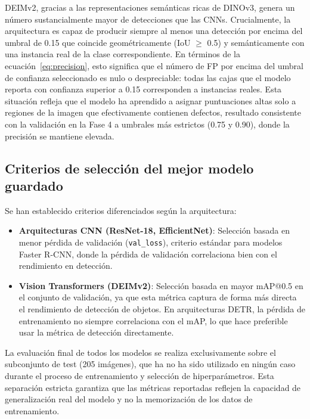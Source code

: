 DEIMv2, gracias a las representaciones semánticas ricas de DINOv3, genera un número sustancialmente mayor de detecciones que las CNNs. Crucialmente, la arquitectura es capaz de producir siempre al menos una detección por encima del umbral de 0.15 que coincide geométricamente (IoU $\geq$ 0.5) y semánticamente con una instancia real de la clase correspondiente. En términos de la ecuación~\eqref{eq:precision}, esto significa que el número de \acrshort{FP} por encima del umbral de confianza seleccionado es nulo o despreciable: todas las cajas que el modelo reporta con confianza superior a 0.15 corresponden a instancias reales. Esta situación refleja que el modelo ha aprendido a asignar puntuaciones altas solo a regiones de la imagen que efectivamente contienen defectos, resultado consistente con la validación en la Fase 4 a umbrales más estrictos (0.75 y 0.90), donde la precisión se mantiene elevada.

\subsection{Criterios de selección del mejor modelo guardado}

Se han establecido criterios diferenciados según la arquitectura:

\begin{itemize}
    \item \textbf{Arquitecturas CNN (ResNet-18, EfficientNet)}: Selección basada en menor pérdida de validación (\texttt{val\_loss}), criterio estándar para modelos Faster R-CNN, donde la pérdida de validación correlaciona bien con el rendimiento en detección.
    \item \textbf{Vision Transformers (DEIMv2)}: Selección basada en mayor mAP@0.5 en el conjunto de validación, ya que esta métrica captura de forma más directa el rendimiento de detección de objetos. En arquitecturas DETR, la pérdida de entrenamiento no siempre correlaciona con el mAP, lo que hace preferible usar la métrica de detección directamente.
\end{itemize}

La evaluación final de todos los modelos se realiza exclusivamente sobre el subconjunto de test (205 imágenes), que ha no ha sido utilizado en ningún caso durante el proceso de entrenamiento y selección de hiperparámetros. Esta separación estricta garantiza que las métricas reportadas reflejen la capacidad de generalización real del modelo y no la memorización de los datos de entrenamiento.


